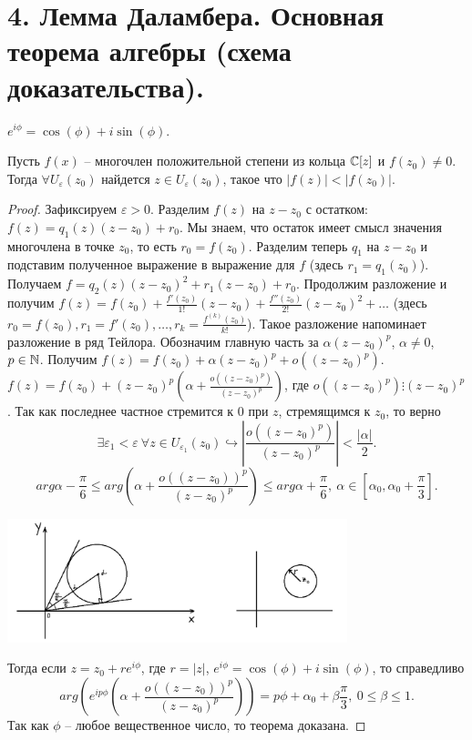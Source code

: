 \section{4. Лемма Даламбера. Основная теорема алгебры (схема доказательства).}

\begin{reminder}
    $e^{i\phi} = \cos(\phi) + i\sin(\phi)$.
\end{reminder}

\begin{lemma}[Д'Аламбера]
    \label{lemma6}
    Пусть $f(x)$ -- многочлен положительной степени из кольца $\mathbb{C}[z]$ и $f(z_0) \neq 0$. Тогда $\forall U_{\varepsilon}(z_0)$ найдется $z \in U_{\varepsilon}(z_0)$, такое что $|f(z)| < |f(z_0)|$.
\end{lemma}

\begin{proof}
    Зафиксируем $\varepsilon > 0$. Разделим $f(z)$ на $z - z_0$ с остатком: $f(z) = q_1(z) (z-z_0) + r_0$. Мы знаем, что остаток имеет смысл значения многочлена в точке $z_0$, то есть $r_0 = f(z_0)$. Разделим теперь $q_1$ на $z - z_0$ и подставим полученное выражение в выражение для $f$ (здесь $r_1 = q_1(z_0)$). Получаем 
    $f = q_2(z)(z-z_0)^2 + r_1(z-z_0) + r_0$. Продолжим разложение и получим
    $f(z) = f(z_0) + \frac{f'(z_0)}{1!}(z - z_0) + \frac{f''(z_0)}{2!}(z - z_0)^2 + \dots$ (здесь $r_0 = f(z_0), r_1 = f'(z_0), \ldots, r_k = \frac {f^{(k)}(z_0)}{k!}$). Такое разложение напоминает разложение в ряд Тейлора.
    Обозначим главную часть за $\alpha (z - z_0)^p$, $\alpha \neq 0$, $p \in \mathbb{N}$. Получим
    $f(z) = f(z_0) + \alpha (z-z_0)^p + o((z-z_0)^p)$.
    $f(z) = f(z_0) + (z - z_0)^p \left( \alpha + \frac{o((z-z_0)^p)}{(z-z_0)^p} \right)$, где $o((z - z_0)^p) \vdots (z - z_0)^p$. Так как последнее частное стремится к 0 при $z$, стремящимся к $z_0$, то верно
    $$\exists \varepsilon_1 < \varepsilon \ \forall z \in U_{\varepsilon_1}(z_0) \hookrightarrow \left| \frac {o((z-z_0)^p)}{(z-z_0)^p} \right| < \frac {|\alpha |}{2}.$$
    $$arg \alpha - \frac {\pi}{6} \leq arg(\alpha + \frac {o((z - z_0))^p}{(z - z_0)^p}) \leq arg \alpha + \frac {\pi}{6}, \ \alpha \in \left[\alpha_0, \alpha_0 + \frac {\pi}{3}\right].$$
    \begin{center}
        \includegraphics[width=0.74\textwidth]{images/lec2_1.png}
    \end{center}
    Тогда если $z = z_0 + re^{i\phi}$, где $r = |z|$, $e^{i\phi} = \cos(\phi) + i\sin(\phi)$, то справедливо $$arg \left( e^{ip\phi} \left( \alpha + \frac {o((z-z_0))^p}{(z-z_0)^p}\right) \right) = p\phi + \alpha_0 + \beta \frac {\pi}{3}, \ 0 \leq \beta \leq 1.$$
    Так как $\phi$ -- любое вещественное число, то теорема доказана.
\end{proof}

